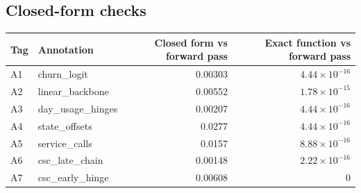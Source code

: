 \begin{drafted}
\subsection{Closed-form checks}\label{app:churn100-s4-c3:closedform}
{\small\noindent\begin{tabularx}{\linewidth}{@{}lXrr@{}}
\toprule Tag & Annotation & Closed form vs forward pass & Exact function vs forward pass \\ \midrule
A1 & churn\_\allowbreak{}logit & 0.00303 & $4.44\times 10^{-16}$ \\
A2 & linear\_\allowbreak{}backbone & 0.00552 & $1.78\times 10^{-15}$ \\
A3 & day\_\allowbreak{}usage\_\allowbreak{}hinges & 0.00207 & $4.44\times 10^{-16}$ \\
A4 & state\_\allowbreak{}offsets & 0.0277 & $4.44\times 10^{-16}$ \\
A5 & service\_\allowbreak{}calls & 0.0157 & $8.88\times 10^{-16}$ \\
A6 & csc\_\allowbreak{}late\_\allowbreak{}chain & 0.00148 & $2.22\times 10^{-16}$ \\
A7 & csc\_\allowbreak{}early\_\allowbreak{}hinge & 0.00608 & 0 \\
\bottomrule
\end{tabularx}\par}

\end{drafted}
